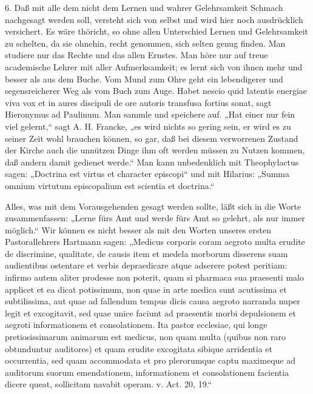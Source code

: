 6. Daß mit alle dem nicht dem Lernen und wahrer Gelehrsamkeit Schmach nachgesagt werden soll, versteht sich von selbst und wird hier noch ausdrücklich versichert. Es wäre thöricht, so ohne allen Unterschied Lernen und Gelehrsamkeit zu schelten, da sie ohnehin, recht genommen, sich selten genug finden. Man studiere nur das Rechte und das allen Ernstes. Man höre nur auf treue academische Lehrer mit aller Aufmerksamkeit; es lernt sich von ihnen mehr und besser als aus dem Buche. Vom Mund zum Ohre geht ein lebendigerer und segensreicherer Weg als vom Buch zum Auge. Habet nescio quid latentis energiae viva vox et in aures discipuli de ore autoris transfusa fortius sonat, sagt Hieronymus ad Paulinum. Man sammle und speichere auf. „Hat einer nur fein viel gelernt,“ sagt A. H. Francke, „es wird nichts so gering sein, er wird es zu seiner Zeit wohl brauchen können, so gar, daß bei diesem verworrenen Zustand der Kirche auch die unnützen Dinge ihm oft werden müssen zu Nutzen kommen, daß andern damit gedienet werde.“ Man kann unbedenklich mit Theophylactus sagen: „Doctrina est virtus et character episcopi“ und mit Hilarius: „Summa omnium virtutum episcopalium est scientia et doctrina.“

Alles, was mit dem Vorausgehenden gesagt werden sollte, läßt sich in die Worte zusammenfassen: „Lerne fürs Amt und werde fürs Amt so gelehrt, als nur immer
möglich.“ Wir können es nicht besser als mit den Worten unseres ersten Pastorallehrers Hartmann sagen: „Medicus corporis coram aegroto multa erudite de discrimine, qualitate, de causis item et medela morborum disserens suam audientibus ostentare et verbis depraedicare atque adserere potest peritiam: infirmo autem aliter prodesse non poterit, quam si pharmaca sua praesenti malo applicet et ea dicat potissimum, non quae in arte medica sunt acutissima et subtilissima, aut quae ad fallendum tempus dicis causa aegroto narranda nuper legit et excogitavit, sed quae unice faciunt ad praesentis morbi depulsionem et aegroti informationem et consolationem. Ita pastor ecclesiae, qui longe pretiosissimarum animarum est medicus, non quam multa (quibus non raro obtunduntur auditores) et quam erudite excogitata sibique arridentia et occurrentia, sed quam accommodata et pro plerorumque captu maximeque ad auditorum suorum emendationem, informationem et consolationem facientia dicere queat, sollicitam navabit operam. v. Act. 20, 19.“

